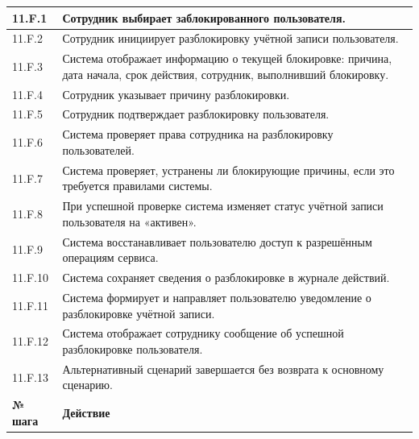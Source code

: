 \documentclass[12pt,a4paper]{article}
\begin{document}
\begin{xltabular}{\textwidth}{
			|>{\raggedright\arraybackslash}p{2.7cm}
			|>{\raggedright\arraybackslash}X|
		}
		11.F.1 & Сотрудник выбирает заблокированного пользователя. \\
		\hline
		11.F.2 & Сотрудник инициирует разблокировку учётной записи пользователя. \\
		\hline
		11.F.3 & Система отображает информацию о текущей блокировке: причина, дата
		начала, срок действия, сотрудник, выполнивший блокировку. \\
		\hline
		11.F.4 & Сотрудник указывает причину разблокировки. \\
		\hline
		11.F.5 & Сотрудник подтверждает разблокировку пользователя. \\
		\hline
		11.F.6 & Система проверяет права сотрудника на разблокировку пользователей. \\
		\hline
		11.F.7 & Система проверяет, устранены ли блокирующие причины, если это
		требуется правилами системы. \\
		\hline
		11.F.8 & При успешной проверке система изменяет статус учётной записи
		пользователя на «активен». \\
		\hline
		11.F.9 & Система восстанавливает пользователю доступ к разрешённым
		операциям сервиса. \\
		\hline
		11.F.10 & Система сохраняет сведения о разблокировке в журнале действий. \\
		\hline
		11.F.11 & Система формирует и направляет пользователю уведомление о
		разблокировке учётной записи. \\
		\hline
		11.F.12 & Система отображает сотруднику сообщение об успешной разблокировке
		пользователя. \\
		\hline
		11.F.13 & Альтернативный сценарий завершается без возврата к основному
		сценарию. \\
		\hline
		
		
		\textbf{№ шага} & \textbf{Действие} \\
		\hline
		

\end{xltabular}
\end{document}
